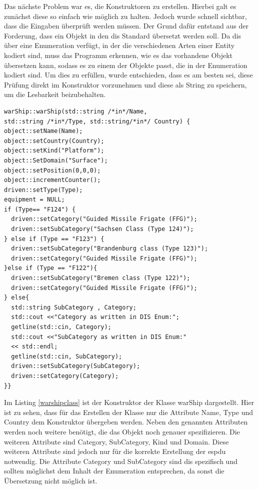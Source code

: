 Das nächste Problem war es, die Konstruktoren zu erstellen. Hierbei galt es zunächst diese so einfach wie möglich zu halten. Jedoch wurde schnell sichtbar, dass die Eingaben überprüft werden müssen. Der Grund dafür entstand aus der Forderung, dass ein Objekt in den \ac{dis} Standard übersetzt werden soll. Da \ac{dis} über eine Enumeration verfügt, in der die verschiedenen Arten einer Entity kodiert sind, muss das Programm erkennen, wie es das vorhandene Objekt übersetzen kann, sodass es zu einem der Objekte passt, die in der Enumeration kodiert sind. Um dies zu erfüllen, wurde entschieden, dass es am besten sei, diese Prüfung direkt im Konstruktor vorzunehmen und diese als String zu speichern, um die Lesbarkeit beizubehalten.   
\begin{lstlisting}[caption =Konstruktor  \glqq warShip\grqq{} Klasse ,label=warshipclass]
warShip::warShip(std::string /*in*/Name,
std::string /*in*/Type, std::string/*in*/ Country) {
object::setName(Name);
object::setCountry(Country);
object::setKind("Platform");
object::SetDomain("Surface");
object::setPosition(0,0,0);
object::incrementCounter();
driven::setType(Type);
equipment = NULL;
if (Type== "F124") {
  driven::setCategory("Guided Missile Frigate (FFG)");
  driven::setSubCategory("Sachsen Class (Type 124)");
} else if (Type == "F123") {
  driven::setSubCategory("Brandenburg class (Type 123)");
  driven::setCategory("Guided Missile Frigate (FFG)");
}else if (Type == "F122"){
  driven::setSubCategory("Bremen class (Type 122)");
  driven::setCategory("Guided Missile Frigate (FFG)");
} else{
  std::string SubCategory , Category;
  std::cout <<"Category as written in DIS Enum:";
  getline(std::cin, Category);
  std::cout <<"SubCategory as written in DIS Enum:"
  << std::endl;
  getline(std::cin, SubCategory);
  driven::setSubCategory(SubCategory);
  driven::setCategory(Category);
}}
\end{lstlisting}
Im Listing \ref{warshipclass} ist der Konstruktor der Klasse \glqq warShip\grqq{} dargestellt. Hier ist zu sehen, dass für das Erstellen der Klasse nur die Attribute \glqq Name\grqq{}, \glqq Type\grqq{} und \glqq Country\grqq{} dem Konstruktor übergeben werden. Neben den genannten Attributen werden noch weitere benötigt, die das Objekt noch genauer spezifizieren.
Die weiteren Attribute sind  \glqq Category\grqq{}, \glqq SubCategory\grqq{}, \glqq Kind\grqq{} und  \glqq Domain\grqq{}. Diese weiteren Attribute sind jedoch nur für die korrekte Erstellung der \ac{espdu} notwendig.
Die Attribute   \glqq Category\grqq{} und \glqq SubCategory\grqq{} sind \ac{dis} spezifisch und sollten möglichst dem Inhalt der Enumeration entsprechen, da sonst die Übersetzung nicht möglich ist. 
